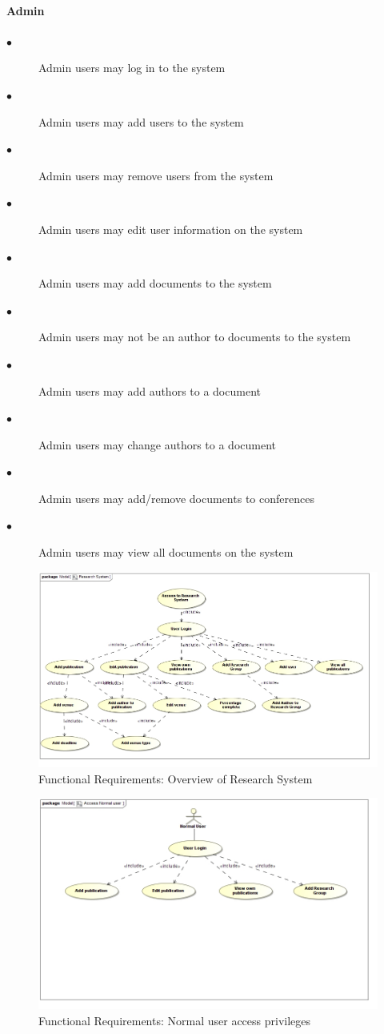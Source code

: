 \documentclass[a4paper]{article}
\begin{document}
\paragraph{\textbf{Admin}}
\begin{description}
  \item[$\bullet$] Admin users may log in to the system
    \item[$\bullet$] Admin users may add users to the system
    \item[$\bullet$] Admin users may remove users from the system
    \item[$\bullet$] Admin users may edit user information on the system
    \item[$\bullet$] Admin users may add documents to the system
    \item[$\bullet$] Admin users may not be an author to documents to the system
    \item[$\bullet$] Admin users may add authors to a document
    \item[$\bullet$] Admin users may change authors to a document
    \item[$\bullet$] Admin users may add/remove documents to conferences
    \item[$\bullet$] Admin users may view all documents on the system
\end{description}
\begin{figure}[H]
\includegraphics[width=\textwidth]{Overview.jpg}
\caption{Functional Requirements: Overview of Research System \label{overflow}}
\end{figure}
\begin{figure}[H]
\includegraphics[width=\textwidth]{AccessNormaluser.jpg}
\caption{Functional Requirements: Normal user access privileges \label{overflow}}
\end{figure}
\end{document}
